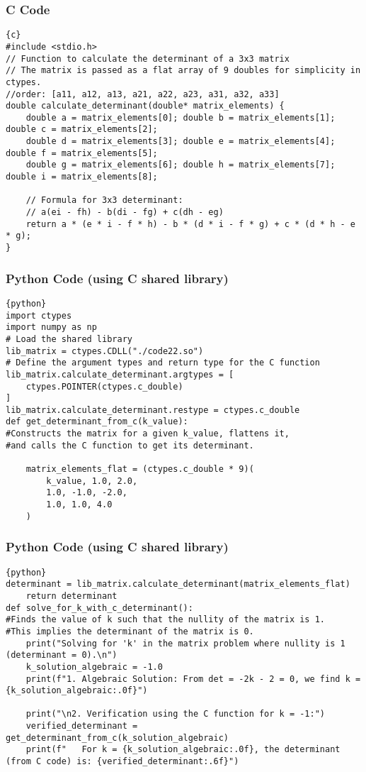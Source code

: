 \documentclass{beamer}
\begin{document}
\begin{frame}[fragile]
\frametitle{C Code}
\begin{lstlisting}{c}
#include <stdio.h>
// Function to calculate the determinant of a 3x3 matrix
// The matrix is passed as a flat array of 9 doubles for simplicity in ctypes.
//order: [a11, a12, a13, a21, a22, a23, a31, a32, a33]
double calculate_determinant(double* matrix_elements) {
    double a = matrix_elements[0]; double b = matrix_elements[1]; double c = matrix_elements[2];
    double d = matrix_elements[3]; double e = matrix_elements[4]; double f = matrix_elements[5];
    double g = matrix_elements[6]; double h = matrix_elements[7]; double i = matrix_elements[8];

    // Formula for 3x3 determinant:
    // a(ei - fh) - b(di - fg) + c(dh - eg)
    return a * (e * i - f * h) - b * (d * i - f * g) + c * (d * h - e * g);
}
\end{lstlisting}
\end{frame}

\begin{frame}[fragile]
\frametitle{Python Code (using C shared library)}
\begin{lstlisting}{python}
import ctypes
import numpy as np
# Load the shared library
lib_matrix = ctypes.CDLL("./code22.so")
# Define the argument types and return type for the C function
lib_matrix.calculate_determinant.argtypes = [
    ctypes.POINTER(ctypes.c_double)
]
lib_matrix.calculate_determinant.restype = ctypes.c_double
def get_determinant_from_c(k_value):
#Constructs the matrix for a given k_value, flattens it,
#and calls the C function to get its determinant.

    matrix_elements_flat = (ctypes.c_double * 9)(
        k_value, 1.0, 2.0,
        1.0, -1.0, -2.0,
        1.0, 1.0, 4.0
    )
\end{lstlisting}
\end{frame}

\begin{frame}[fragile]
\frametitle{Python Code (using C shared library)}
\begin{lstlisting}{python}
determinant = lib_matrix.calculate_determinant(matrix_elements_flat)
    return determinant
def solve_for_k_with_c_determinant():
#Finds the value of k such that the nullity of the matrix is 1.
#This implies the determinant of the matrix is 0.
    print("Solving for 'k' in the matrix problem where nullity is 1 (determinant = 0).\n")
    k_solution_algebraic = -1.0
    print(f"1. Algebraic Solution: From det = -2k - 2 = 0, we find k = {k_solution_algebraic:.0f}")

    print("\n2. Verification using the C function for k = -1:")
    verified_determinant = get_determinant_from_c(k_solution_algebraic)
    print(f"   For k = {k_solution_algebraic:.0f}, the determinant (from C code) is: {verified_determinant:.6f}")
\end{lstlisting}
\end{frame}
\end{document}
